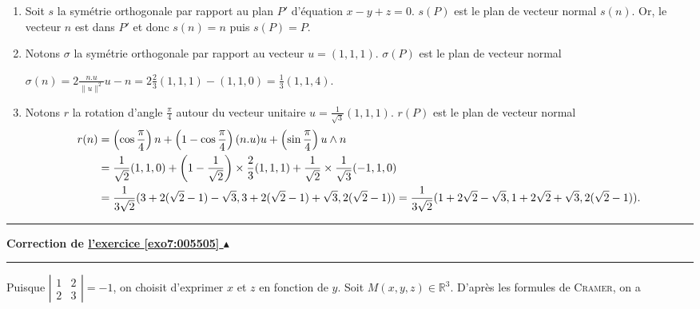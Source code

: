 \documentclass[11pt,a4paper]{article}
\newcommand{\Rr}{\mathbb{R}} \newcommand{\R}{\mathbb{R}}
\newcounter{exo}
\newcommand{\correction}[1]{\hypertarget{cor7:#1}{}\label{cor7:#1}{\bf Correction de \hyperlink{exo7:#1}{l'exercice \ref{exo7:#1} $\blacktriangle$}}\vspace{1mm}\hrule\vspace{1mm}}
\newcommand{\fincorrection}{\vspace{1mm}\hrule\vspace*{7mm}}
\begin{document}
\begin{enumerate}
 \item  Soit $s$ la symétrie orthogonale par rapport au plan $P'$ d'équation $x-y+z=0$. $s(P)$ est le plan de vecteur normal $s(n)$. 
Or, le vecteur $n$ est dans $P'$  et donc $s(n)=n$ puis $s(P)=P$.

\begin{center}
\end{center}
 \item  Notons $\sigma$ la symétrie orthogonale par rapport au vecteur $u=(1,1,1)$. $\sigma(P)$ est le plan de vecteur normal 

\begin{center}
$\sigma(n)=2\frac{n.u}{\|u\|^2}u-n=2\frac{2}{3}(1,1,1)-(1,1,0)=\frac{1}{3}(1,1,4)$.
\end{center}

\begin{center}
\end{center}
 \item  Notons $r$ la rotation d'angle $\frac{\pi}{4}$ autour du vecteur unitaire $u=\frac{1}{\sqrt{3}}(1,1,1)$. $r(P)$ est le plan de vecteur normal 
\begin{align*}\ensuremath
r(n)&=\left(\cos\frac{\pi}{4}\right)n+\left(1-\cos\frac{\pi}{4}\right)(n.u)u+\left(\sin\frac{\pi}{4}\right)u\wedge n\\
 &=\frac{1}{\sqrt{2}}(1,1,0)+\left(1-\frac{1}{\sqrt{2}}\right)\times\frac{2}{3}(1,1,1)+\frac{1}{\sqrt{2}}\times\frac{1}{\sqrt{3}}(-1,1,0)\\
 &=\frac{1}{3\sqrt{2}}(3+2(\sqrt{2}-1)-\sqrt{3},3+2(\sqrt{2}-1)+\sqrt{3},2(\sqrt{2}-1))=\frac{1}{3\sqrt{2}}(1+2\sqrt{2}-\sqrt{3},1+2\sqrt{2}+\sqrt{3},2(\sqrt{2}-1)).
\end{align*}

\begin{center}
\end{center}
\end{enumerate}
\fincorrection
\correction{005505}
Puisque $\left|
\begin{array}{cc}
1&2\\
2&3
\end{array}\right|=-1$, on choisit d'exprimer $x$ et $z$ en fonction de $y$.
Soit $M(x,y,z)\in\Rr^3$. D'après les formules de \textsc{Cramer}, on a
\end{document}

